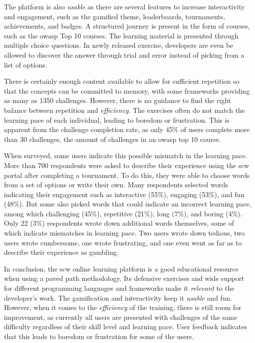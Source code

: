 The platform is also \textit{usable} as there are several features to increase interactivity and engagement, such as the gamified theme, leaderboards, tournaments, achievements, and badges.
A structured journey is present in the form of courses, such as the \gls{owasp} Top 10 courses.
The learning material is presented through multiple choice questions.
In newly released exercise, developers are even be allowed to discover the answer through trial and error instead of picking from a list of options.

There is certainly enough content available to allow for sufficient repetition so that the concepts can be committed to memory, with some frameworks providing as many as 1350 challenges.
However, there is no guidance to find the right balance between repetition and \textit{efficiency}.
The exercises often do not match the learning pace of each individual, leading to boredom or frustration.
This is apparent from the challenge completion rate, as only 45\% of users complete more than 30 challenges, the amount of challenges in an \gls{owasp} top 10 course.

When surveyed, some users indicate this possible mismatch in the learning pace.
More than 700 respondents were asked to describe their experience using the \gls{scw} portal after completing a tournament.
To do this, they were able to choose words from a set of options or write their own.
Many respondents selected words indicating their engagement such as interactive (55\%), engaging (53\%), and fun (48\%).
But some also picked words that could indicate an incorrect learning pace, among which challenging (45\%), repetitive (21\%), long (7\%), and boring (4\%).
Only 22 (3\%) respondents wrote down additional words themselves, some of which indicate mismatches in learning pace. 
Two users wrote down tedious, two users wrote cumbersome, one wrote frustrating, and one even went as far as to describe their experience as gambling.

In conclusion, the \gls{scw} online learning platform is a good educational resource when using a paved path methodology. Its defensive exercises and wide support for different programming languages and frameworks make it \textit{relevant} to the developer's work. The gamification and interactivity keep it \textit{usable} and fun. However, when it comes to the \textit{efficiency} of the training, there is still room for improvement, as currently all users are presented with challenges of the same difficulty regardless of their skill level and learning pace.
User feedback indicates that this leads to boredom or frustration for some of the users. 